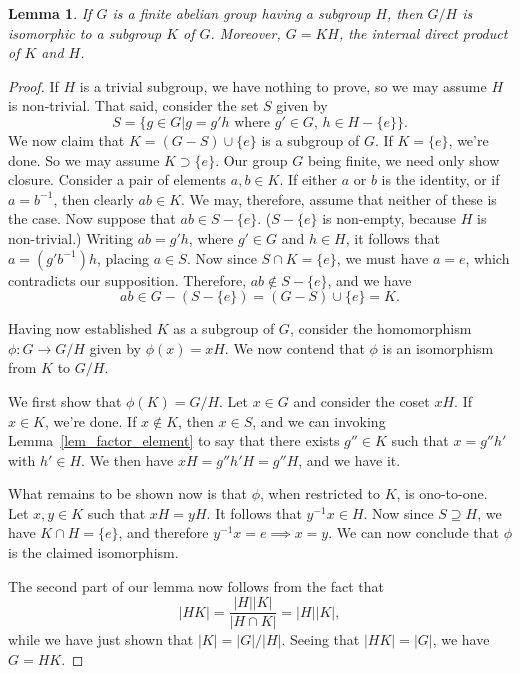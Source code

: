 \documentclass[12pt]{article}
\newtheorem{lemma}{Lemma}[section]
\begin{document}
\begin{lemma}\label{lem_factor_group}
If $G$ is a finite abelian group having a subgroup $H$, then
$G/H$ is isomorphic to a subgroup $K$ of $G$.
Moreover, $G=KH$, the internal direct product of $K$ and $H$.
\end{lemma}
\begin{proof}
If $H$ is a trivial subgroup, we have nothing to prove,
so we may assume $H$ is non-trivial.  That said, consider
the set $S$ given by
\begin{equation*}
S = \{g\in G|\mbox{$g=g'h$ where $g'\in G$, $h\in H-\{e\}$}\}.
\end{equation*}
We now claim that $K=(G-S)\cup\{e\}$ is a subgroup of $G$.
If $K=\{e\}$, we're done.  So we may assume $K\supset\{e\}$. Our group $G$ being finite, we
need only show closure.  Consider a pair of elements $a,b\in K$.
If either $a$ or $b$ is the identity, or if $a=b^{-1}$, then clearly $ab\in K$.
We may, therefore, assume that neither of these is the case.
Now suppose that $ab\in S-\{e\}$.  ($S-\{e\}$ is non-empty, because $H$ is non-trivial.)
Writing $ab=g'h$, where $g'\in G$ and $h\in H$,
it follows that $a=(g'b^{-1})h$, placing $a\in S$.  Now since $S\cap K=\{e\}$,
we must have $a=e$, which contradicts our supposition.
Therefore, $ab\not\in S-\{e\}$, and we have
\begin{equation*}
ab\in G-(S-\{e\})=(G-S)\cup\{e\}=K.
\end{equation*}

Having now established $K$ as a subgroup of $G$, consider the homomorphism
$\phi:G\to G/H$ given by $\phi(x)=xH$.  We now contend that $\phi$ is an
isomorphism from $K$ to $G/H$.

We first show that $\phi(K)=G/H$.  Let $x\in G$ and consider the
coset $xH$.  If $x\in K$, we're done.  If $x\not\in K$, then $x\in S$,
and we can invoking Lemma~\ref{lem_factor_element} to say that
there exists $g''\in K$ such that $x=g''h'$ with $h'\in H$.
We then have $xH=g''h'H=g''H$, and we have it.

What remains to be shown now is that $\phi$, when restricted to $K$,
is ono-to-one.  Let $x,y\in K$ such that $xH=yH$.
It follows that $y^{-1}x\in H$.  Now since $S\supseteq H$, we have $K\cap H=\{e\}$,
and therefore $y^{-1}x=e\implies x=y$.  We can now conclude that $\phi$
is the claimed isomorphism.

The second part of our lemma now follows from the fact that
\begin{equation*}
|HK|=\frac{|H||K|}{|H\cap K|}=|H||K|,
\end{equation*}
while we have just shown that $|K|=|G|/|H|$.
Seeing that $|HK|=|G|$, we have $G=HK$.
\end{proof}
\end{document}
